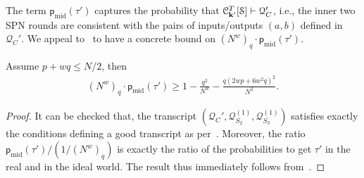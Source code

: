 \documentclass[journal=tosc,final,nohyperref]{iacrtrans}
\begin{document}
The term $\mathsf{p}_{\mathrm{mid}}(\tau')$ captures the probability that $\mathcal{C}_{\mathbf{k}'}^T[\mathcal{S}] \vdash \mathcal{Q}_C'$, i.e., the inner two SPN rounds are consistent with the pairs of inputs/outputs $(a,b)$ defined in $\mathcal{Q}_C'$. We appeal to~\cite{EPRINT:CogLee18} to have a concrete bound on $(N^w)_q\cdot\mathsf{p}_{\mathrm{mid}}(\tau')$.

\begin{lemma}
	\label{lemma:bound-middle-two-rounds}
	
	Assume $p+wq\leq N/2$, then
	\begin{align}
	(N^w)_q\cdot\mathsf{p}_{\mathrm{mid}}(\tau') \geq 1-\frac{q^2}{N^w}-\frac{q(2wp+6w^2q)^2}{N^2}.
	\label{eq:bound-on-epsilon-mid}
	\end{align}
\end{lemma}
\begin{proof}
	It can be checked that, the transcript $(\mathcal{Q}_C',\mathcal{Q}_{S_2}^{(1)},\mathcal{Q}_{S_3}^{(1)})$ satisfies exactly the conditions defining a good transcript as per~\cite[page 16]{EPRINT:CogLee18}. Moreover,
	the ratio $\mathsf{p}_{\mathrm{mid}}(\tau')/(1/(N^w)_q)$ is exactly the ratio of the probabilities to get $\tau'$ in the real and in the ideal world. The result thus immediately follows from~\cite[Lemma 9]{EPRINT:CogLee18}.
\end{proof}



%
\end{document}
